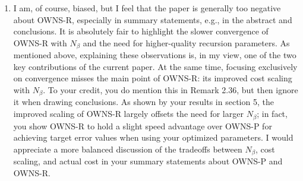 \documentclass{article}
\begin{document}
\begin{enumerate}

    \item I am, of course, biased, but I feel that the paper is generally too negative about OWNS-R, especially in summary statements, e.g., in the abstract and conclusions. It is absolutely fair to highlight the slower convergence of OWNS-R with $N_\beta$ and the need for higher-quality recursion parameters. As mentioned above, explaining these observations is, in my view, one of the two key contributions of the current paper. At the same time, focusing exclusively on convergence misses the main point of OWNS-R: its improved cost scaling with $N_\beta$. To your credit, you do mention this in Remark 2.36, but then ignore it when drawing conclusions. As shown by your results in section 5, the improved scaling of OWNS-R largely offsets the need for larger $N_\beta$; in fact, you show OWNS-R to hold a slight speed advantage over OWNS-P for achieving target error values when using your optimized parameters. I would appreciate a more balanced discussion of the tradeoffs between $N_\beta$, cost scaling, and actual cost in your summary statements about OWNS-P and OWNS-R.
    

\end{enumerate}
\end{document}

